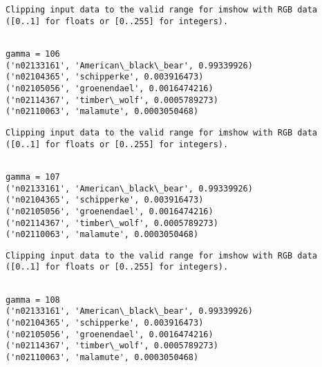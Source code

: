 \documentclass[11pt]{article}
\begin{document}
    \begin{Verbatim}[commandchars=\\\{\}]
Clipping input data to the valid range for imshow with RGB data ([0..1] for floats or [0..255] for integers).

    \end{Verbatim}

    \begin{Verbatim}[commandchars=\\\{\}]

gamma = 106
('n02133161', 'American\_black\_bear', 0.99339926)
('n02104365', 'schipperke', 0.003916473)
('n02105056', 'groenendael', 0.0016474216)
('n02114367', 'timber\_wolf', 0.0005789273)
('n02110063', 'malamute', 0.0003050468)

    \end{Verbatim}

    \begin{Verbatim}[commandchars=\\\{\}]
Clipping input data to the valid range for imshow with RGB data ([0..1] for floats or [0..255] for integers).

    \end{Verbatim}

    \begin{Verbatim}[commandchars=\\\{\}]

gamma = 107
('n02133161', 'American\_black\_bear', 0.99339926)
('n02104365', 'schipperke', 0.003916473)
('n02105056', 'groenendael', 0.0016474216)
('n02114367', 'timber\_wolf', 0.0005789273)
('n02110063', 'malamute', 0.0003050468)

    \end{Verbatim}

    \begin{Verbatim}[commandchars=\\\{\}]
Clipping input data to the valid range for imshow with RGB data ([0..1] for floats or [0..255] for integers).

    \end{Verbatim}

    \begin{Verbatim}[commandchars=\\\{\}]

gamma = 108
('n02133161', 'American\_black\_bear', 0.99339926)
('n02104365', 'schipperke', 0.003916473)
('n02105056', 'groenendael', 0.0016474216)
('n02114367', 'timber\_wolf', 0.0005789273)
('n02110063', 'malamute', 0.0003050468)

    \end{Verbatim}
\end{document}
